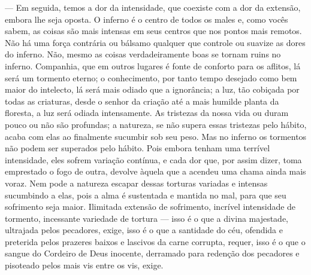  --- Em seguida, temos a dor da intensidade, que coexiste com a dor da
extensão, embora lhe seja oposta. O inferno é o centro de todos os
males e, como vocês sabem, as coisas são mais intensas em seus centros
que nos pontos mais remotos. Não há uma força contrária ou bálsamo
qualquer que controle ou suavize as dores do inferno. Não, mesmo as
coisas verdadeiramente boas se tornam ruins no inferno. Companhia, que
em outros lugares é fonte de conforto para os aflitos, lá será um
tormento eterno; o conhecimento, por tanto tempo desejado como bem
maior do intelecto, lá será mais odiado que a ignorância; a luz, tão
cobiçada por todas as criaturas, desde o senhor da criação até a mais
humilde planta da floresta, a luz será odiada intensamente. As
tristezas da nossa vida ou duram pouco ou não são profundas; a
natureza, se não supera essas tristezas pelo hábito, acaba com elas ao
finalmente sucumbir sob seu peso. Mas no inferno os tormentos não podem
ser superados pelo hábito. Pois embora tenham uma terrível intensidade,
eles sofrem variação contínua, e cada dor que, por assim dizer, toma
emprestado o fogo de outra, devolve àquela que a acendeu uma chama
ainda mais voraz. Nem pode a natureza escapar dessas torturas variadas
e intensas sucumbindo a elas, pois a alma é sustentada e mantida no
mal, para que seu sofrimento seja maior. Ilimitada extensão de
sofrimento, incrível intensidade de tormento, incessante variedade de
tortura --- isso é o que a divina majestade, ultrajada pelos pecadores,
exige, isso é o que a santidade do céu, ofendida e preterida pelos
prazeres baixos e lascivos da carne corrupta, requer, isso é o que o
sangue do Cordeiro de Deus inocente, derramado para redenção dos
pecadores e pisoteado pelos mais vis entre os vis, exige.


